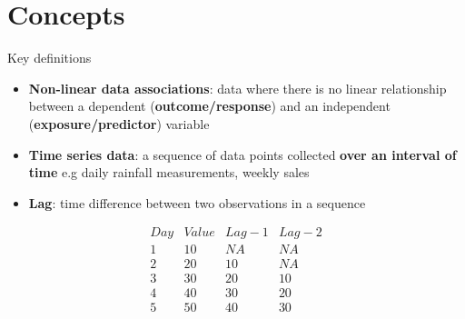 \documentclass[english]{beamer}
\newcommand{\alertblue}[1]{{\color{blue}#1}}
\begin{document}
\section{Concepts}
\begin{frame}{Key definitions}
        \begin{itemize}
        \item \alertblue{\textbf{Non-linear data associations}}: data where there is no linear relationship between a dependent (\alertblue{\textbf{outcome/response}}) and an independent (\alertblue{\textbf{exposure/predictor}}) variable \\
        \item \alertblue{\textbf{Time series data}}: a sequence of data points collected \alertblue{\textbf{over an interval of time}} e.g daily rainfall measurements, weekly sales \\
        \item \alertblue{\textbf{Lag}}: time difference between two observations in a sequence
    \end{itemize}
    \vspace{0.25cm}
        \centering
        \[\begin{array}{|c|c|c|c|}
        {Day} & {Value} & {Lag-1} & {Lag-2}\\ \hline
        1 & 10 & NA & NA \\
        2 & 20 & 10 & NA \\
        3 & 30 & 20 & 10 \\
        4 & 40 & 30 & 20 \\
        5 & 50 & 40 & 30 
\end{array}\] 
\end{frame}
\end{document}
